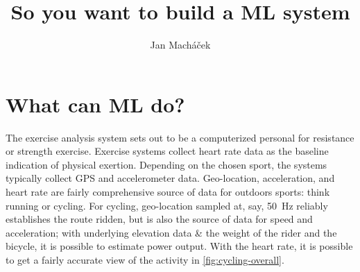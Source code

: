 



\title{So you want to build a ML system}

\author{Jan Macháček}




\section{What can ML do?}
The exercise analysis system sets out to be a computerized personal for resistance or strength exercise. Exercise systems collect heart rate data as the baseline indication of physical exertion. Depending on the chosen sport, the systems typically collect GPS and accelerometer data. Geo-location, acceleration, and heart rate are fairly comprehensive source of data for outdoors sports: think running or cycling. For cycling, geo-location sampled at, say, \SI{50}{\hertz} reliably establishes the route ridden, but is also the source of data for speed and acceleration; with underlying elevation data \& the weight of the rider and the bicycle, it is possible to estimate power output. With the heart rate, it is possible to get a  fairly accurate view of the activity in \autoref{fig:cycling-overall}.

